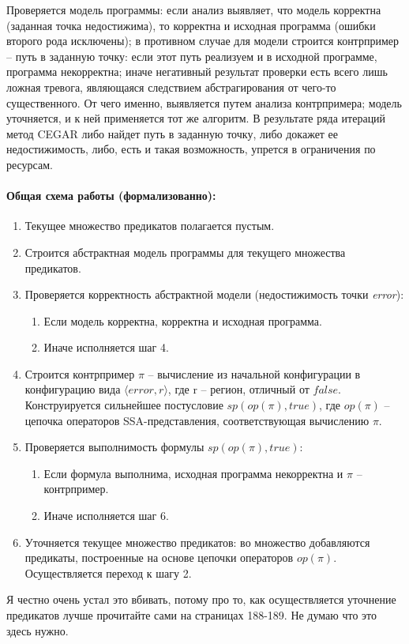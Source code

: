 Проверяется модель программы: если анализ выявляет, что модель корректна (заданная точка недостижима), то корректна и исходная программа (ошибки второго рода исключены); 
в противном случае для модели строится контрпример -- путь в заданную точку: если этот путь реализуем и в исходной программе, программа некорректна; 
иначе негативный результат проверки есть всего лишь ложная тревога, являющаяся следствием абстрагирования от чего-то существенного.
От чего именно, выявляется путем анализа контрпримера; модель уточняется, и к ней применяется тот же алгоритм. 
В результате ряда итераций метод CEGAR либо найдет путь в заданную точку, либо докажет ее недостижимость, либо, есть и такая возможность, упрется в ограничения по ресурсам.

\paragraph{Общая схема работы (формализованно):}

\begin{enumerate}
	\item Текущее множество предикатов полагается пустым.
	\item Строится абстрактная модель программы для текущего множества предикатов.
	\item Проверяется корректность абстрактной модели (недостижимость точки \textit{error}):
		\begin{enumerate}
			\item Если модель корректна, корректна и исходная программа.
			\item Иначе исполняется шаг 4.
		\end{enumerate}
	\item Строится контрпример $\pi$ -- вычисление из начальной конфигурации в конфигурацию вида $\langle \textit{error}, r \rangle$, где r -- регион, отличный от $\textit{false}$. \newline Конструируется сильнейшее постусловие $sp(op(\pi), \textit{true})$, где $\textit{op}(\pi)$ -- цепочка операторов SSA-представления, соответствующая вычислению $\pi$.
	\item Проверяется выполнимость формулы $sp(op(\pi), \textit{true})$:
		\begin{enumerate}
			\item Если формула выполнима, исходная программа некорректна и $\pi$ -- контрпример.
			\item Иначе исполняется шаг 6.
		\end{enumerate}
	\item Уточняется текущее множество предикатов: во множество добавляются предикаты, построенные на основе цепочки операторов $\textit{op}(\pi)$. \newline Осуществляется переход к шагу 2.
\end{enumerate}

Я честно очень устал это вбивать, потому про то, как осуществляется уточнение предикатов лучше прочитайте сами на страницах 188-189. Не думаю что это здесь нужно.










